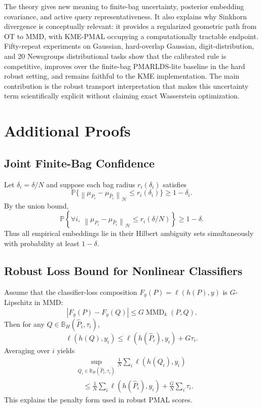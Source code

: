 \documentclass[10pt,journal]{IEEEtran}
\DeclareMathOperator{\MMD}{MMD}
\newcommand{\Prob}{\mathbb{P}}
\newcommand{\Hcal}{\mathcal{H}}
\newcommand{\wh}{\widehat}
\newcommand{\norm}[1]{\left\lVert #1 \right\rVert}
\newcommand{\ball}{\mathbb{B}}
\begin{document}
The theory gives new meaning to finite-bag uncertainty, posterior embedding covariance, and active query representativeness. It also explains why Sinkhorn divergence is conceptually relevant: it provides a regularized geometric path from OT to MMD, with KME-PMAL occupying a computationally tractable endpoint. Fifty-repeat experiments on Gaussian, hard-overlap Gaussian, digit-distribution, and 20 Newsgroups distributional tasks show that the calibrated rule is competitive, improves over the finite-bag PMARLDS-lite baseline in the hard robust setting, and remains faithful to the KME implementation. The main contribution is the robust transport interpretation that makes this uncertainty term scientifically explicit without claiming exact Wasserstein optimization.

\iffalse
\appendices

\section{Additional Proofs}
\label{app:proofs}

\subsection{Joint Finite-Bag Confidence}

Let $\delta_i=\delta/N$ and suppose each bag radius $r_i(\delta_i)$ satisfies
\begin{equation}
    \Prob\{\norm{\mu_{P_i}-\mu_{\wh P_i}}_{\Hcal}\le r_i(\delta_i)\}\ge 1-\delta_i.
\end{equation}
By the union bound,
\begin{equation}
    \Prob\left\{\forall i,\ \norm{\mu_{P_i}-\mu_{\wh P_i}}_{\Hcal}\le r_i(\delta/N)\right\}\ge 1-\delta.
\end{equation}
Thus all empirical embeddings lie in their Hilbert ambiguity sets simultaneously with probability at least $1-\delta$.

\subsection{Robust Loss Bound for Nonlinear Classifiers}

Assume that the classifier-loss composition $F_y(P)=\ell(h(P),y)$ is $G$-Lipschitz in MMD:
\begin{equation}
    |F_y(P)-F_y(Q)|\le G\MMD_k(P,Q).
\end{equation}
Then for any $Q\in\ball_H(\wh P_i,\tau_i)$,
\begin{equation}
    \ell(h(Q),y_i)\le \ell(h(\wh P_i),y_i)+G\tau_i.
\end{equation}
Averaging over $i$ yields
\begin{equation}
\begin{aligned}
&\sup_{Q_i\in\ball_H(\wh P_i,\tau_i)}
\frac{1}{N}\sum_i\ell(h(Q_i),y_i)\\
&\quad\le
\frac{1}{N}\sum_i\ell(h(\wh P_i),y_i)
+\frac{G}{N}\sum_i\tau_i.
\end{aligned}
\end{equation}
This explains the penalty form used in robust PMAL scores.
\end{document}
